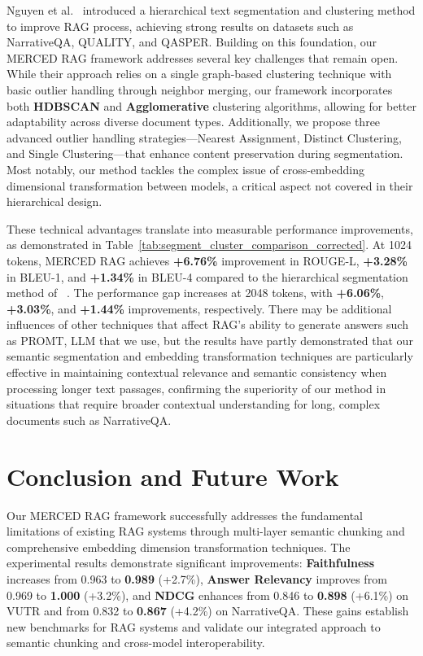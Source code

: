\documentclass[10pt,twocolumn,letterpaper]{article}
\begin{document}
\vspace{0.5em}
Nguyen et al.~\cite{nguyen2025enhancing} introduced a hierarchical text segmentation and clustering method to improve RAG process, achieving strong results on datasets such as NarrativeQA, QUALITY, and QASPER. Building on this foundation, our MERCED RAG framework addresses several key challenges that remain open. While their approach relies on a single graph-based clustering technique with basic outlier handling through neighbor merging, our framework incorporates both \textbf{HDBSCAN} and \textbf{Agglomerative} clustering algorithms, allowing for better adaptability across diverse document types. Additionally, we propose three advanced outlier handling strategies—Nearest Assignment, Distinct Clustering, and Single Clustering—that enhance content preservation during segmentation. Most notably, our method tackles the complex issue of cross-embedding dimensional transformation between models, a critical aspect not covered in their hierarchical design.

\vspace{0.5em}
These technical advantages translate into measurable performance improvements, as demonstrated in Table~\ref{tab:segment_cluster_comparison_corrected}. At 1024 tokens, MERCED RAG achieves \textbf{+6.76\%} improvement in ROUGE-L, \textbf{+3.28\%} in BLEU-1, and \textbf{+1.34\%} in BLEU-4 compared to the hierarchical segmentation method of ~\cite{nguyen2025enhancing}. The performance gap increases at 2048 tokens, with \textbf{+6.06\%}, \textbf{+3.03\%}, and \textbf{+1.44\%} improvements, respectively. There may be additional influences of other techniques that affect RAG's ability to generate answers such as PROMT, LLM that we use, but the results have partly demonstrated that our semantic segmentation and embedding transformation techniques are particularly effective in maintaining contextual relevance and semantic consistency when processing longer text passages, confirming the superiority of our method in situations that require broader contextual understanding for long, complex documents such as NarrativeQA.

\section{Conclusion and Future Work}

Our MERCED RAG framework successfully addresses the fundamental limitations of existing RAG systems through multi-layer semantic chunking and comprehensive embedding dimension transformation techniques. The experimental results demonstrate significant improvements: \textbf{Faithfulness} increases from 0.963 to \textbf{0.989} (+2.7\%), \textbf{Answer Relevancy} improves from 0.969 to \textbf{1.000} (+3.2\%), and \textbf{NDCG} enhances from 0.846 to \textbf{0.898} (+6.1\%) on VUTR and from 0.832 to \textbf{0.867} (+4.2\%) on NarrativeQA. These gains establish new benchmarks for RAG systems and validate our integrated approach to semantic chunking and cross-model interoperability.
\end{document}

